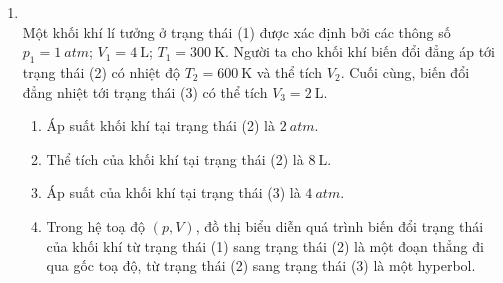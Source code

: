 \begin{enumerate}[label=\bfseries Câu \arabic*:, leftmargin=1.7cm]
\item {}\\
Một khối khí lí tưởng ở trạng thái (1) được xác định bởi các thông số $p_1=\SI{1}{atm}$; $V_1=\SI{4}{\liter}$; $T_1=\SI{300}{\kelvin}$. Người ta cho khối khí biến đổi đẳng áp tới trạng thái (2) có nhiệt độ $T_2=\SI{600}{\kelvin}$ và thể tích $V_2$. Cuối cùng, biến đổi đẳng nhiệt tới trạng thái (3) có thể tích $V_3=\SI{2}{\liter}$.
\begin{enumerate}[label=\alph*)]
	\item Áp suất khối khí tại trạng thái (2) là $\SI{2}{atm}$.
	\item Thể tích của khối khí tại trạng thái (2) là $\SI{8}{\liter}$.
	\item Áp suất của khối khí tại trạng thái (3) là $\SI{4}{atm}$.
	\item Trong hệ toạ độ $(p, V)$, đồ thị biểu diễn quá trình biến đổi trạng thái của khối khí từ trạng thái (1) sang trạng thái (2) là một đoạn thẳng đi qua gốc toạ độ, từ trạng thái (2) sang trạng thái (3) là một hyperbol.
\end{enumerate} 


\end{enumerate}
